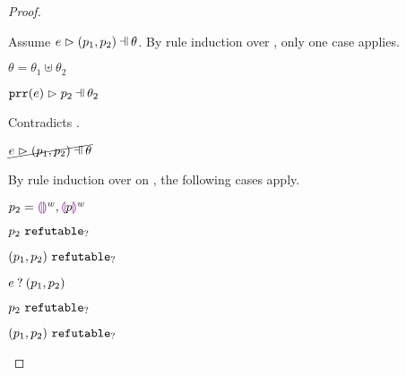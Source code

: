 \begin{proof}
\begin{byCases}
\begin{byCases}
\begin{byCases}
            Assume $\hpatmatch{e}{\hpair{p_1}{p_2}}{\theta}$. By rule induction over , only one case applies.
            \begin{byCases}
            \item[\text{(\ref{rule:MNotIntroPair})}]
                \begin{pfsteps*}
                \item $\theta=\theta_1\uplus\theta_2$ 
                \item $\hpatmatch{\hprr{e}}{p_2}{\theta_2}$  
                \end{pfsteps*}
                Contradicts .
            \end{byCases}
            \begin{pfsteps*}
            \item $\cancel{\hpatmatch{e}{\hpair{p_1}{p_2}}{\theta}}$ 
            \end{pfsteps*}
            By rule induction over  on , the following cases apply.
            \begin{byCases}
            \item[\text{(\ref{rule:MMEHole}),(\ref{rule:MMHole})}]
                \begin{pfsteps*}
                \item $p_2=\textcolor{violet}{\llparenthesis}\textcolor{violet}{\rrparenthesis}^{w},\textcolor{violet}{\llparenthesis} p\textcolor{violet}{\rrparenthesis}^{w}$ 
                \item $p_2 ~\mathtt{refutable}_?$  
                \item $(p_1 , p_2) ~\mathtt{refutable}_?$  
                \item $e \mathbin{?} (p_1 , p_2)$ 
                \end{pfsteps*}
            \item[\text{(\ref{rule:MMNotIntro})}]
                \begin{pfsteps*}
                \item $p_2 ~\mathtt{refutable}_?$  
                \item $(p_1 , p_2) ~\mathtt{refutable}_?$  

\end{pfsteps*}
\end{byCases}
\end{byCases}
\end{byCases}
\end{byCases}
\end{proof}
